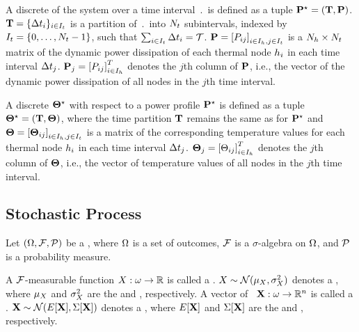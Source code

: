 A discrete  of the system over a time interval $\period$ is defined as a tuple $\mathbf{P}^\star = (\mathbf{T}, \mathbf{P})$. $\mathbf{T} = \{ \Delta t_i \}_{i \in I_t}$ is a partition of $\period$ into $N_t$ subintervals, indexed by $I_t = \{ 0, \dots, N_t - 1 \}$, such that $\sum_{i \in I_t} \Delta t_i = \mathcal{T}$. $\mathbf{P} = \left[P_{ij}\right]_{i \in I_h, j \in I_t}$ is a $N_h \times N_t$ matrix of the dynamic power dissipation of each thermal node $h_i$ in each time interval $\Delta t_j$. $\mathbf{P}_j = \left[P_{ij}\right]^T_{i \in I_h}$ denotes the $j$th column of $\mathbf{P}$, i.e., the vector of the dynamic power dissipation of all nodes in the $j$th time interval.

A discrete  $\mathbf{\Theta}^\star$ with respect to a power profile $\mathbf{P}^\star$ is defined as a tuple $\mathbf{\Theta}^\star = (\mathbf{T}, \mathbf{\Theta})$, where the time partition $\mathbf{T}$ remains the same as for $\mathbf{P}^\star$ and $\mathbf{\Theta} = \left[\mathbf{\Theta}_{ij}\right]_{i \in I_h, j \in I_t}$ is a matrix of the corresponding temperature values for each thermal node $h_i$ in each time interval $\Delta t_j$. $\mathbf{\Theta}_j = \left[\Theta_{ij}\right]^T_{i \in I_h}$ denotes the $j$th column of $\mathbf{\Theta}$, i.e., the vector of temperature values of all nodes in the $j$th time interval.

\subsection{Stochastic Process}
Let $(\Omega, \mathcal{F}, \mathcal{P})$ be a  \cite{oksendal2003}, where $\Omega$ is a set of outcomes, $\mathcal{F}$ is a $\sigma$-algebra on $\Omega$, and $\mathcal{P}$ is a probability measure.

A $\mathcal{F}$-measurable function $X: \omega \to \mathbb{R}$ is called a . $X \sim \mathcal{N}(\mu_{X}, \sigma_{X}^2)$ denotes a , where $\mu_{X}$ and $\sigma_{X}^2$ are the  and , respectively. A vector of \rvs\ $\mathbf{X}: \omega \to \mathbb{R}^n$ is called a . $\mathbf{X} \sim \mathcal{N}(E[\mathbf{X}], \Sigma[\mathbf{X}])$ denotes a , where $E[\mathbf{X}]$ and $\Sigma[\mathbf{X}]$ are the  and , respectively.

